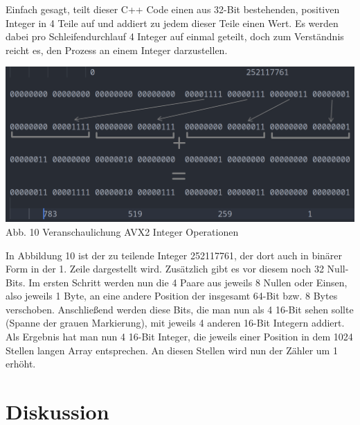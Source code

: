 \documentclass[10pt,a4paper]{article}
\begin{document}
Einfach gesagt, teilt dieser C++ Code einen aus 32-Bit bestehenden, positiven Integer in 4 Teile auf und addiert
zu jedem dieser Teile einen Wert. Es werden dabei pro Schleifendurchlauf 4 Integer auf einmal geteilt, doch zum Verständnis reicht es,
den Prozess an einem Integer darzustellen.

\begin{center}
    \includegraphics[width=1\textwidth]{./diagramme/matplotlib/avx2explanationfull.png}
    Abb. 10 Veranschaulichung AVX2 Integer Operationen
\end{center}

In Abbildung 10 ist der zu teilende Integer 252117761, der dort auch in binärer Form in der 1. Zeile
dargestellt wird. Zusätzlich gibt es vor diesem noch 32 Null-Bits. Im ersten Schritt werden nun die 4
Paare aus jeweils 8 Nullen oder Einsen, also jeweils 1 Byte, an eine andere Position der insgesamt 64-Bit bzw. 8
Bytes verschoben. Anschließend werden diese Bits, die man nun als 4 16-Bit sehen sollte (Spanne der grauen Markierung),
mit jeweils 4 anderen 16-Bit Integern addiert. Als Ergebnis hat man nun 4 16-Bit Integer, die
jeweils einer Position in dem 1024 Stellen langen Array entsprechen. An diesen Stellen wird nun der Zähler
um 1 erhöht.

\clearpage

\section{Diskussion}
\end{document}

